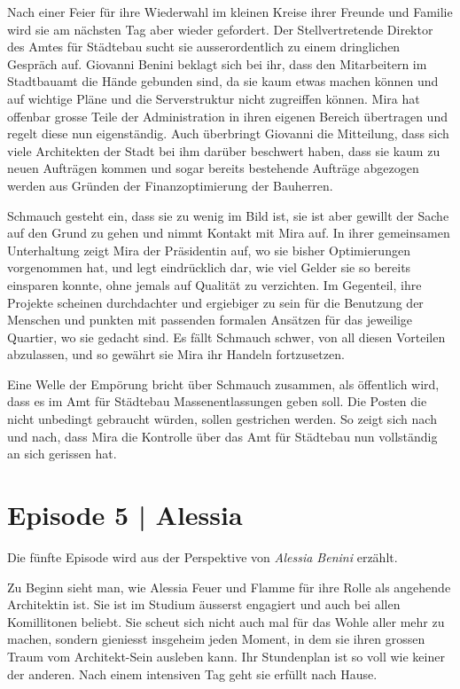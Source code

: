 \documentclass[11pt,a4paper,ngerman]{scrreprt}
\begin{document}
Nach einer Feier für ihre Wiederwahl im kleinen Kreise ihrer Freunde und
Familie wird sie am nächsten Tag aber wieder gefordert. Der Stellvertretende
Direktor des Amtes für Städtebau sucht sie ausserordentlich zu einem
dringlichen Gespräch auf. Giovanni Benini beklagt sich bei ihr, dass den
Mitarbeitern im Stadtbauamt die Hände gebunden sind, da sie kaum etwas machen
können und auf wichtige Pläne und die Serverstruktur nicht zugreiffen
können. Mira hat offenbar grosse Teile der Administration in ihren eigenen
Bereich übertragen und regelt diese nun eigenständig. Auch überbringt
Giovanni die Mitteilung, dass sich viele Architekten der Stadt bei ihm
darüber beschwert haben, dass sie kaum zu neuen Aufträgen kommen und sogar
bereits bestehende Aufträge abgezogen werden aus Gründen der
Finanzoptimierung der Bauherren.

Schmauch gesteht ein, dass sie zu wenig im Bild ist, sie ist aber gewillt der
Sache auf den Grund zu gehen und nimmt Kontakt mit Mira auf. In ihrer
gemeinsamen Unterhaltung zeigt Mira der Präsidentin auf, wo sie bisher
Optimierungen vorgenommen hat, und legt eindrücklich dar, wie viel Gelder sie
so bereits einsparen konnte, ohne jemals auf Qualität zu verzichten. Im
Gegenteil, ihre Projekte scheinen durchdachter und ergiebiger zu sein für die
Benutzung der Menschen und punkten mit passenden formalen Ansätzen für das
jeweilige Quartier, wo sie gedacht sind. Es fällt Schmauch schwer, von all
diesen Vorteilen abzulassen, und so gewährt sie Mira ihr Handeln
fortzusetzen.

Eine Welle der Empörung bricht über Schmauch zusammen, als öffentlich wird,
dass es im Amt für Städtebau Massenentlassungen geben soll. Die Posten die
nicht unbedingt gebraucht würden, sollen gestrichen werden. So zeigt sich
nach und nach, dass Mira die Kontrolle über das Amt für Städtebau nun
vollständig an sich gerissen hat.

\section*{Episode 5 | Alessia}

Die fünfte Episode wird aus der Perspektive von \emph{Alessia Benini} erzählt.

Zu Beginn sieht man, wie Alessia Feuer und Flamme für ihre Rolle als
angehende Architektin ist. Sie ist im Studium äusserst engagiert und auch bei
allen Komillitonen beliebt. Sie scheut sich nicht auch mal für das Wohle
aller mehr zu machen, sondern gieniesst insgeheim jeden Moment, in dem sie
ihren grossen Traum vom Architekt-Sein ausleben kann. Ihr Stundenplan ist so
voll wie keiner der anderen. Nach einem intensiven Tag geht sie erfüllt nach
Hause.
\end{document}
